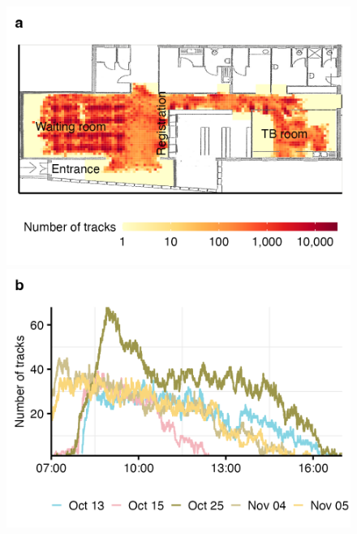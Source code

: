 \documentclass[fleqn,11pt]{wlscirep}
\begin{document}
\begin{figure}
    \centering
     \includegraphics{results/data/no-people-spatial.png}
    \includegraphics{results/data/no-people-over-time.png}

\end{figure}
\end{document}
